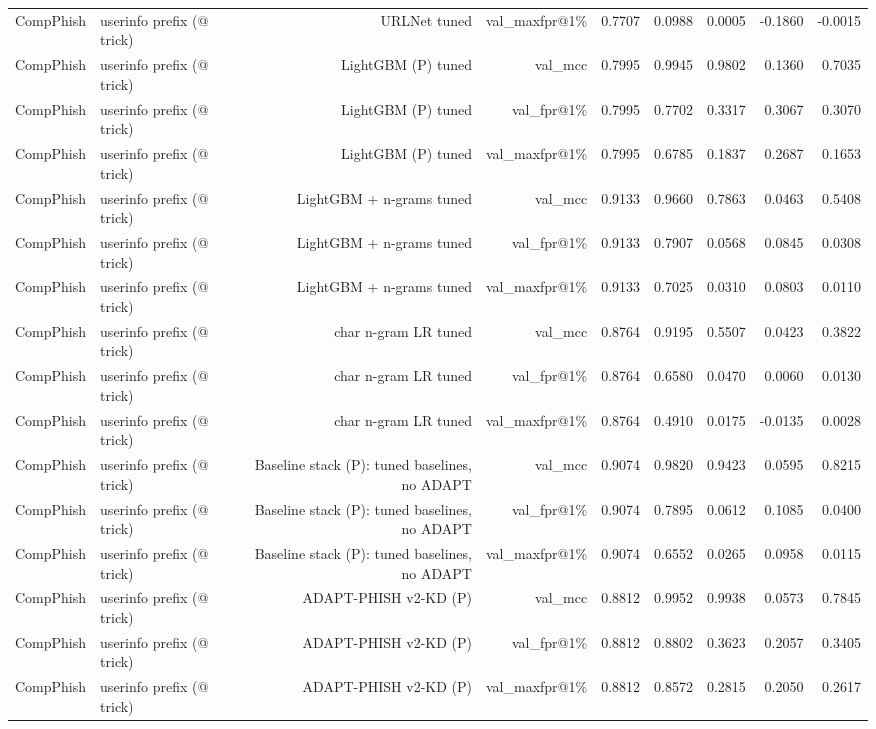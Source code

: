 \begin{table}[t]
\begin{tabular}{llrrrrrrr}
CompPhish & userinfo prefix (@ trick) & URLNet tuned & val\_maxfpr@1\% & 0.7707 & 0.0988 & 0.0005 & -0.1860 & -0.0015 \\
CompPhish & userinfo prefix (@ trick) & LightGBM (P) tuned & val\_mcc & 0.7995 & 0.9945 & 0.9802 & 0.1360 & 0.7035 \\
CompPhish & userinfo prefix (@ trick) & LightGBM (P) tuned & val\_fpr@1\% & 0.7995 & 0.7702 & 0.3317 & 0.3067 & 0.3070 \\
CompPhish & userinfo prefix (@ trick) & LightGBM (P) tuned & val\_maxfpr@1\% & 0.7995 & 0.6785 & 0.1837 & 0.2687 & 0.1653 \\
CompPhish & userinfo prefix (@ trick) & LightGBM + n-grams tuned & val\_mcc & 0.9133 & 0.9660 & 0.7863 & 0.0463 & 0.5408 \\
CompPhish & userinfo prefix (@ trick) & LightGBM + n-grams tuned & val\_fpr@1\% & 0.9133 & 0.7907 & 0.0568 & 0.0845 & 0.0308 \\
CompPhish & userinfo prefix (@ trick) & LightGBM + n-grams tuned & val\_maxfpr@1\% & 0.9133 & 0.7025 & 0.0310 & 0.0803 & 0.0110 \\
CompPhish & userinfo prefix (@ trick) & char n-gram LR tuned & val\_mcc & 0.8764 & 0.9195 & 0.5507 & 0.0423 & 0.3822 \\
CompPhish & userinfo prefix (@ trick) & char n-gram LR tuned & val\_fpr@1\% & 0.8764 & 0.6580 & 0.0470 & 0.0060 & 0.0130 \\
CompPhish & userinfo prefix (@ trick) & char n-gram LR tuned & val\_maxfpr@1\% & 0.8764 & 0.4910 & 0.0175 & -0.0135 & 0.0028 \\
CompPhish & userinfo prefix (@ trick) & Baseline stack (P): tuned baselines, no ADAPT & val\_mcc & 0.9074 & 0.9820 & 0.9423 & 0.0595 & 0.8215 \\
CompPhish & userinfo prefix (@ trick) & Baseline stack (P): tuned baselines, no ADAPT & val\_fpr@1\% & 0.9074 & 0.7895 & 0.0612 & 0.1085 & 0.0400 \\
CompPhish & userinfo prefix (@ trick) & Baseline stack (P): tuned baselines, no ADAPT & val\_maxfpr@1\% & 0.9074 & 0.6552 & 0.0265 & 0.0958 & 0.0115 \\
CompPhish & userinfo prefix (@ trick) & ADAPT-PHISH v2-KD (P) & val\_mcc & 0.8812 & 0.9952 & 0.9938 & 0.0573 & 0.7845 \\
CompPhish & userinfo prefix (@ trick) & ADAPT-PHISH v2-KD (P) & val\_fpr@1\% & 0.8812 & 0.8802 & 0.3623 & 0.2057 & 0.3405 \\
CompPhish & userinfo prefix (@ trick) & ADAPT-PHISH v2-KD (P) & val\_maxfpr@1\% & 0.8812 & 0.8572 & 0.2815 & 0.2050 & 0.2617 \\

\end{tabular}
\end{table}
